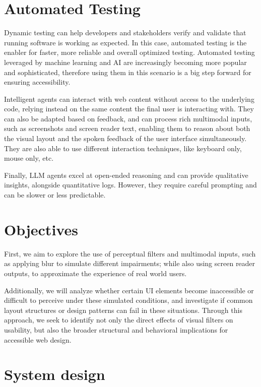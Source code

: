 \section{Automated Testing}

Dynamic testing can help developers and stakeholders verify and validate that running software is working as expected. In this case, automated testing is the enabler for faster, more reliable and overall optimized testing. Automated testing leveraged by machine learning and \ac{AI} are increasingly becoming more popular and sophisticated, therefore using them in this scenario is a big step forward for ensuring accessibility. %

Intelligent agents can interact with web content without access to the underlying code, relying instead on the same content the final user is interacting with\cite{lanham2025ai, wang2024survey, lu2025uxagent}. They can also be adapted based on feedback, and can process rich multimodal inputs, such as screenshots and screen reader text, enabling them to reason about both the visual layout and the spoken feedback of the user interface simultaneously. They are also able to use different interaction techniques, like keyboard only, mouse only, etc. 

Finally, LLM agents excel at open-ended reasoning and can provide qualitative insights, alongside quantitative logs. However, they require careful prompting and can be slower or less predictable.


\section{Objectives}

First, we aim to explore the use of perceptual filters and multimodal inputs, such as applying blur to simulate different impairments; while also using screen reader outputs, to approximate the experience of real world users. 

Additionally, we will analyze whether certain \ac{UI} elements become inaccessible or difficult to perceive under these simulated conditions, and investigate if common layout structures or design patterns can fail in these situations. Through this approach, we seek to identify not only the direct effects of visual filters on usability, but also the broader structural and behavioral implications for accessible web design.

\section{System design}
